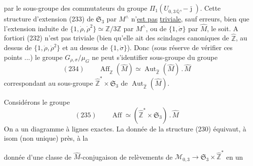 


par le sous-groupe  des commutateurs
du groupe $\Pi_1(U_{0,3\,\overline{\mathbb Q}},-\bar{\jmath})$.
Cette  structure d'extension (233) de $\mathfrak S_3$
par $M^\wedge$ n'\uline{est pas} \uline{triviale}, sauf erreurs,
bien que l'extension induite de
$\{1,\dot\rho,\dot\rho^2\}\simeq\mathbb Z/3\mathbb Z$ par $M^\wedge$,
ou de $\{1,\dot\sigma\}$ par $\widehat M$, le soit.
A fortiori (232) n'est pas triviale (bien qu'elle ait des scindages
canoniques  de $\widehat{\mathbb Z}$, au dessus de
$\{1,\dot\rho,\dot\rho^2\}$ et au dessus de $\{1,\dot\sigma\}$).
Donc (sous réserve de vérifier ces points ...)
le groupe $G_{\rho,\sigma}/\mu_G$ ne peut s'identifier
 sous-groupe du groupe 
\[
(234)\qquad
\boxed{\operatorname{Aff}_{\widehat{\mathbb Z}}(\widehat M)
\simeq\operatorname{Aut}_{\widehat{\mathbb Z}}(\widehat M)\mathbin{.}\widehat M}
\]
correspondant au sous-groupe $\widehat{\mathbb Z}^{*}\times\mathfrak S_3$
de $\operatorname{Aut}_{\widehat{\mathbb Z}}(\widehat M)$.

 Considérons le groupe
\[
(235)\qquad
\operatorname{Aff}\simeq
(\widehat{\mathbb Z}^{*}\times\mathfrak S_3)\mathbin{.}\widehat M
\]
On a un diagramme
à lignes exactes. La donnée de la structure (230) équivaut,
à isom (non unique) près, à la



donnée d'une classe de $\widehat M$-conjugaison de relèvements
de $\mathcal M_{0,3}\longrightarrow\mathfrak S_3\times\widehat{\mathbb Z}^{*}$
en un


